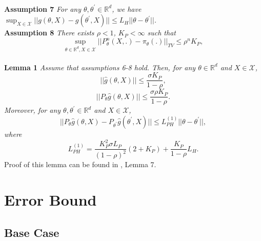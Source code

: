 \documentclass[a4paper]{article}
\begin{document}
\\
\textbf{Assumption 7} \textit{
For any $\theta, \theta^{\prime} \in \mathbb{R}^{d}$, we have $\sup_{X \in \mathcal{X}}||g\left(\theta, X\right) - g\left(\theta^{\prime}, X\right)|| \le L_{H}||\theta - \theta^{\prime}||$.
}
\\
\textbf{Assumption 8} \textit{
There exists $\rho < 1$, $K_{P} < \infty$ such that
\begin{equation}
	\sup_{\theta \in \mathbb{R}^{d}, X \in \mathcal{X}} ||P_{\theta}^{n}\left(X, .\right) - \pi_{\theta}(.)||_{TV} \le \rho^{n}K_{P},
\end{equation}
}
\\
\textbf{Lemma 1} \textit{
Assume that assumptions 6-8 hold. Then, for any $\theta \in \mathbb{R}^{d}$ and $X \in \mathcal{X}$,
\begin{equation}
	||\hat{g}\left(\theta, X\right)|| \le \frac{\sigma K_{P}}{1 - \rho},
\end{equation}
\begin{equation}
	||P_{\theta}\hat{g}\left(\theta, X\right)|| \le \frac{\sigma \rho K_{P}}{1 - \rho}.
\end{equation}
Moreover, for any $\theta, \theta^{\prime} \in \mathbb{R}^{d}$ and $X \in \mathcal{X}$,
\begin{equation}
	||P_{\theta}\hat{g}\left(\theta, X\right) - P_{\theta^{\prime}}\hat{g}\left(\theta^{\prime}, X\right)|| \le L_{PH}^{(1)}||\theta - \theta^{\prime}||,
\end{equation}
where
\begin{equation}
	L_{PH}^{(1)} = \frac{K_{P}^{2}\sigma L_{P}}{(1 - \rho)^{2}}\left(2 + K_{P}\right) + \frac{K_{P}}{1 - \rho}L_{H}.
\end{equation}
}
Proof of this lemma can be found in \cite{karimi2019non}, Lemma 7.
\section{Error Bound}

\subsection{Base Case}
\end{document}

